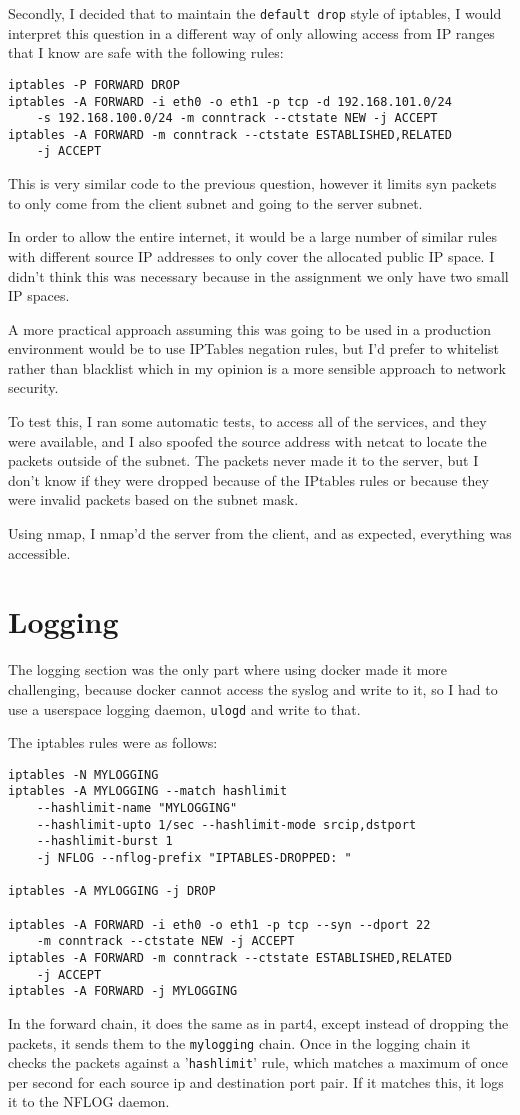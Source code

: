 \documentclass[12pt]{article}
\begin{document}
Secondly, I decided that to maintain the \texttt{default drop} style of iptables, I would interpret this question in a different way of only allowing access from IP ranges that I know are safe with the following rules:
\begin{verbatim}iptables -P FORWARD DROP
iptables -A FORWARD -i eth0 -o eth1 -p tcp -d 192.168.101.0/24
    -s 192.168.100.0/24 -m conntrack --ctstate NEW -j ACCEPT
iptables -A FORWARD -m conntrack --ctstate ESTABLISHED,RELATED
    -j ACCEPT\end{verbatim}
This is very similar code to the previous question, however it limits syn packets to only come from the client subnet and going to the server subnet.

In order to allow the entire internet, it would be a large number of similar rules with different source IP addresses to only cover the allocated public IP space.
I didn't think this was necessary because in the assignment we only have two small IP spaces.

A more practical approach assuming this was going to be used in a production environment would be to use IPTables negation rules, but I'd prefer to whitelist rather than blacklist which in my opinion is a more sensible approach to network security.

To test this, I ran some automatic tests, to access all of the services, and they were available, and I also spoofed the source address with netcat to locate the packets outside of the subnet.
The packets never made it to the server, but I don't know if they were dropped because of the IPtables rules or because they were invalid packets based on the subnet mask.

Using nmap, I nmap'd the server from the client, and as expected, everything was accessible.
\section{Logging}
The logging section was the only part where using docker made it more challenging, because docker cannot access the syslog and write to it, so I had to use a userspace logging daemon, \texttt{ulogd} and write to that.

The iptables rules were as follows:
\begin{verbatim}
iptables -N MYLOGGING
iptables -A MYLOGGING --match hashlimit
    --hashlimit-name "MYLOGGING"
    --hashlimit-upto 1/sec --hashlimit-mode srcip,dstport
    --hashlimit-burst 1
    -j NFLOG --nflog-prefix "IPTABLES-DROPPED: "

iptables -A MYLOGGING -j DROP

iptables -A FORWARD -i eth0 -o eth1 -p tcp --syn --dport 22
    -m conntrack --ctstate NEW -j ACCEPT
iptables -A FORWARD -m conntrack --ctstate ESTABLISHED,RELATED
    -j ACCEPT
iptables -A FORWARD -j MYLOGGING
\end{verbatim}
In the forward chain, it does the same as in part4, except instead of dropping the packets, it sends them to the \texttt{mylogging} chain.
Once in the logging chain it checks the packets against a '\texttt{hashlimit}' rule, which matches a maximum of once per second for each source ip and destination port pair. If it matches this, it logs it to the NFLOG daemon.
\end{document}
